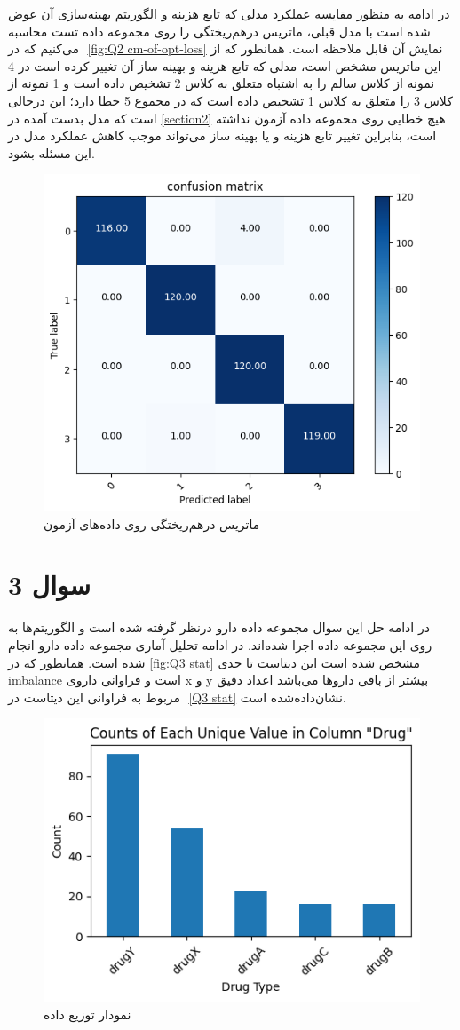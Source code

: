 \documentclass{article}
\begin{document}
در ادامه به منظور مقایسه عملکرد مدلی که تابع هزینه و الگوریتم بهینه‌سازی آن عوض شده است با مدل قبلی، ماتریس درهم‌ریختگی را روی مجموعه داده تست محاسبه می‌کنیم که در ‎
\autoref{fig:Q2 cm-of-opt-loss}
نمایش آن قابل ملاحظه است. همانطور که از این ماتریس مشخص است، مدلی که تابع هزینه و بهینه ساز آن تغییر کرده است در 4 نمونه از کلاس سالم را به اشتباه متعلق به کلاس 2 تشخیص داده است و 1 نمونه از کلاس 3 را متعلق به کلاس 1 تشخیص داده است که در مجموع 5 خطا دارد؛ این درحالی است که مدل بدست آمده در
\autoref{section2}
هیچ خطایی روی محموعه داده آزمون نداشته است، بنابراین تغییر تابع هزینه و یا بهینه ساز می‌تواند موجب کاهش عملکرد مدل در این مسئله بشود.  
\begin{figure}[H]
\centering
\includegraphics[width=0.5\linewidth]{"img/Q2/cm of opt loss"}
\caption{ماتریس درهم‌ریختگی روی داده‌های آزمون}
\label{fig:Q2 cm-of-opt-loss}
\end{figure}

\section{سوال 3}

در ادامه حل این سوال مجموعه داده دارو درنظر گرفته شده است و الگوریتم‌ها به روی این مجموعه داده اجرا شده‌اند.
در ادامه تحلیل آماری مجموعه داده دارو انجام شده است. همانطور که در 
\autoref{fig:Q3 stat}
مشخص شده است این دیتاست تا حدی 
imbalance
است و فراوانی داروی x و y بیشتر از باقی داروها می‌باشد اعداد دقیق مربوط به فراوانی این دیتاست در ‎
\autoref{Q3 stat}
نشان‌داده‌شده است.
\begin{figure}[H]
\centering
\includegraphics[width=1\linewidth]{img/Q3/stat}
\caption{نمودار توزیع داده}
\label{fig:Q3 stat}
\end{figure}
\end{document}
